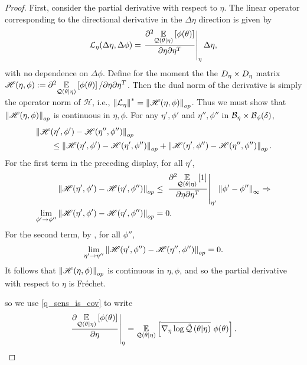 \begin{lem}
\begin{proof}
First, consider the partial derivative with respect to $\eta$.  The
linear operator corresponding to the directional derivative in the
$\Delta \eta$ direction is given by
%
\begin{align*}
%
\linop_\eta(\Delta \eta, \Delta \phi) =
    \fracat{\partial^2 \expect{\q(\theta \vert \eta)}{\phi(\theta)}}
           {\partial \eta \partial\eta^T}{\eta} \Delta \eta,
%
\end{align*}
%
with no dependence on $\Delta \phi$.  Define for the moment the the ${D_{\eta}}
\times {D_{\eta}}$ matrix $\mathscr{H}(\eta, \phi) := \partial^2 \underset{\mathcal{Q}(\theta
\vert \eta)}{\mathbb{E}}\left[\phi(\theta)\right] / \partial \eta \partial \eta^T$.  Then the dual norm
of the derivative is simply the operator norm of $\mathscr{H}$, i.e.,
$\left\Vert\mathcal{L}_\eta\right\Vert^* = \left\Vert\mathscr{H}(\eta, \phi)\right\Vert_{op}$. Thus we must show
that $\left\Vert\mathscr{H}(\eta, \phi)\right\Vert_{op}$ is continuous in $\eta, \phi$.  For
any $\eta', \phi'$ and $\eta'', \phi''$ in $\mathcal{B}_\eta \times
\mathcal{B}_\phi(\delta)$,
%
\begin{align*}
%
\MoveEqLeft
\norm{\mathscr{H}(\eta', \phi') - \mathscr{H}(\eta'', \phi'')}_{op} \\
&\le
\norm{\mathscr{H}(\eta', \phi') - \mathscr{H}(\eta', \phi'')}_{op} +
\norm{\mathscr{H}(\eta', \phi'') - \mathscr{H}(\eta'', \phi'')}_{op}.
%
\end{align*}
%
For the first term in the preceding display, for all $\eta'$,
%
\begin{align*}
%
\norm{\mathscr{H}(\eta', \phi') - \mathscr{H}(\eta', \phi'')}_{op}
    \le{}&
    \fracat{\partial^2 \expect{\q(\theta \vert \eta)}{1}}
           {\partial \eta \partial\eta^T}{\eta'} \norminf{\phi' - \phi''}
           \Rightarrow\\
\lim_{\phi' \rightarrow \phi''}
\norm{\mathscr{H}(\eta', \phi') - \mathscr{H}(\eta', \phi'')}_{op} ={}& 0.
%
\end{align*}
%
For the second term, by , for all $\phi''$,
%
\begin{align*}
%
\lim_{\eta' \rightarrow \eta''}
    \norm{\mathscr{H}(\eta', \phi'') - \mathscr{H}(\eta'', \phi'')}_{op} = 0.
%
\end{align*}
%
It follows that $\left\Vert\mathscr{H}(\eta, \phi)\right\Vert_{op}$ is continuous in $\eta,
\phi$, and so the partial derivative with respect to $\eta$ is Fr{\'e}chet.

\hrulefill

 so we
use \eqref{q_sens_is_cov} to write
%
\begin{align*}
%
\fracat{\partial \expect{\q(\theta \vert \eta)}{\phi(\theta)}}
       {\partial \eta}{\eta}
={}
\expect{\q(\theta \vert \eta)}
       {\lqgradbar{\theta \vert \eta} \phi(\theta)}.
%
\end{align*}
%



\end{proof}
\end{lem}
